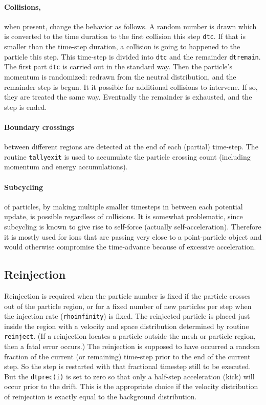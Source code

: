 \documentclass[12pt]{article}
\begin{document}
\paragraph{Collisions,} when present, change the behavior as follows. A
random number is drawn which is converted to the time duration to the
first collision this step \verb!dtc!. If that is smaller than the
time-step duration, a collision is going to happened to the particle
this step. This time-step is divided into \verb!dtc! and the remainder
\verb!dtremain!. The first part \verb!dtc! is carried out in the
standard way. Then the particle's momentum is randomized: redrawn from
the neutral distribution, and the remainder step is begun. It it
possible for additional collisions to intervene. If so, they are
treated the same way. Eventually the remainder is exhausted, and the
step is ended.

\paragraph{Boundary crossings} between different regions are detected
at the end of each (partial) time-step. The routine \verb!tallyexit!
is used to accumulate the particle crossing count (including momentum
and energy accumulations). 

\paragraph{Subcycling} of particles, by making multiple smaller
timesteps in between each potential update, is possible regardless of
collisions. It is somewhat problematic, since subcycling is known
to give rise to self-force (actually self-acceleration). Therefore it
is mostly used for ions that are passing very close to a
point-particle object and would otherwise compromise the time-advance
because of excessive acceleration.

\subsection{Reinjection} 
Reinjection is required when the particle number is fixed if the
particle crosses out of the particle region, or for a fixed number of
new particles per step when the injection rate (\verb!rhoinfinity!) is
fixed. The reinjected particle is placed just inside the region with a
velocity and space distribution determined by routine
\verb!reinject!. (If a reinjection locates a particle outside the mesh
or particle region, then a fatal error occurs.) The reinjection is
supposed to have occurred a random fraction of the current (or
remaining) time-step prior to the end of the current step. So the step
is restarted with that fractional timestep still to be executed. But
the \verb!dtprec(i)! is set to zero so that only a half-step
acceleration (kick) will occur prior to the drift. This is the
appropriate choice if the velocity distribution of reinjection is
exactly equal to the background distribution.
\end{document}
